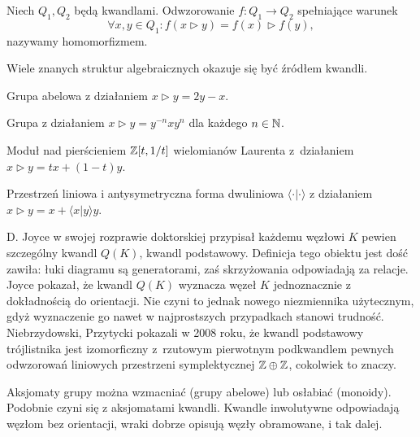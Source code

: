 \begin{definition}
    Niech $Q_1, Q_2$ będą kwandlami.
    Odwzorowanie $f \colon Q_1 \to Q_2$ spełniające warunek
    \begin{equation}
        \forall x, y \in Q_1 : f(x \triangleright y) = f(x) \triangleright f(y),
    \end{equation}
    nazywamy homomorfizmem.
\end{definition}

Wiele znanych struktur algebraicznych okazuje się być źródłem kwandli.

\begin{example}
    Grupa abelowa z działaniem $x \triangleright y = 2y - x$.
\end{example}

\begin{example}
    Grupa z działaniem $x \triangleright y = y^{-n} x y^n$ dla każdego $n \in \mathbb N$.
\end{example}

\begin{example}
    Moduł nad pierścieniem $\mathbb Z[t, 1/t]$ wielomianów Laurenta z~działaniem $x \triangleright y =tx + (1-t) y$.
\end{example}

\begin{example}
    Przestrzeń liniowa i antysymetryczna forma dwuliniowa $\langle \cdot | \cdot \rangle$ z działaniem $x \triangleright y = x + \langle x | y \rangle y$.
\end{example}

D. Joyce w swojej rozprawie doktorskiej przypisał każdemu węzłowi $K$ pewien szczególny kwandl $Q(K)$, kwandl podstawowy.
Definicja tego obiektu jest dość zawiła: łuki diagramu są generatorami, zaś skrzyżowania odpowiadają za relacje.
Joyce pokazał, że kwandl $Q(K)$ wyznacza węzeł $K$ jednoznacznie z dokładnością do orientacji.
Nie czyni to jednak nowego niezmiennika użytecznym, gdyż wyznaczenie go nawet w najprostszych przypadkach stanowi trudność.
Niebrzydowski, Przytycki pokazali w 2008 roku, że kwandl podstawowy trójlistnika jest izomorficzny z~rzutowym pierwotnym podkwandlem pewnych odwzorowań liniowych przestrzeni symplektycznej $\mathbb Z \oplus \mathbb Z$, cokolwiek to znaczy.

Aksjomaty grupy można wzmacniać (grupy abelowe) lub osłabiać (monoidy).
Podobnie czyni się z aksjomatami kwandli.
Kwandle inwolutywne odpowiadają węzłom bez orientacji, wraki dobrze opisują węzły obramowane, i tak dalej.

